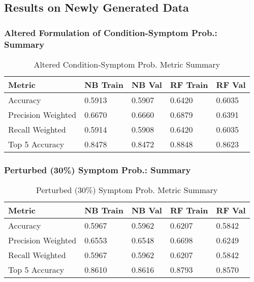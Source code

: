 \documentclass{beamer}
\begin{document}
\subsection{Results on Newly Generated Data}
\begin{frame}
\frametitle{Altered Formulation of Condition-Symptom Prob.: Summary }
\begin{table}[]
	\begin{tabular}{|l|l|l|l|l|}
		\hline
		Metric             & NB Train & NB Val & RF Train  & RF Val \\ \hline
		Accuracy         & 0.5913 & 0.5907   &0.6420 & 0.6035     \\ \hline
		Precision Weighted & 0.6670 & 0.6660 &0.6879 & 0.6391     \\ \hline
		Recall Weighted     & 0.5914 & 0.5908 & 0.6420 & 0.6035    \\ \hline
		Top 5 Accuracy      & 0.8478 & 0.8472 & 0.8848 &  0.8623    \\ \hline
	\end{tabular}
	\caption{Altered Condition-Symptom Prob. Metric Summary}
	\label{table:tab_3}
\end{table}
\end{frame}

\begin{frame}
\frametitle{Perturbed (30\%) Symptom Prob.: Summary }
\begin{table}[]
	\begin{tabular}{|l|l|l|l|l|}
		\hline
		Metric             & NB Train & NB Val & RF Train  & RF Val \\ \hline
		Accuracy         & 0.5967 & 0.5962   &0.6207 & 0.5842     \\ \hline
		Precision Weighted & 0.6553 &  0.6548 &0.6698 & 0.6249     \\ \hline
		Recall Weighted     & 0.5967 & 0.5962 & 0.6207 & 0.5842    \\ \hline
		Top 5 Accuracy      &0.8610 & 0.8616 &0.8793 &  0.8570    \\ \hline
	\end{tabular}
	\caption{Perturbed (30\%) Symptom Prob. Metric Summary}
	\label{table:tab_4}
\end{table}
\end{frame}
\end{document}
